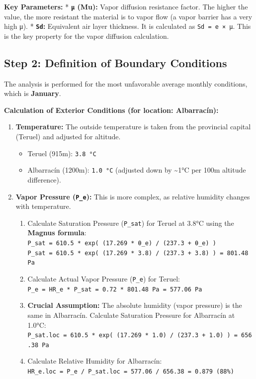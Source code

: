 \documentclass[
  10pt,
  letterpaper,
]{scrbook}
\providecommand{\tightlist}{%
  \setlength{\itemsep}{0pt}\setlength{\parskip}{0pt}}
\begin{document}
\textbf{Key Parameters:} * \textbf{\texttt{μ} (Mu):} Vapor diffusion
resistance factor. The higher the value, the more resistant the material
is to vapor flow (a vapor barrier has a very high μ). *
\textbf{\texttt{Sd}:} Equivalent air layer thickness. It is calculated
as \texttt{Sd\ =\ e\ ×\ μ}. This is the key property for the vapor
diffusion calculation.

\subsection{Step 2: Definition of Boundary
Conditions}\label{step-2-definition-of-boundary-conditions}

The analysis is performed for the most unfavorable average monthly
conditions, which is \textbf{January}.

\textbf{Calculation of Exterior Conditions (for location: Albarracín):}

\begin{enumerate}
\def\labelenumi{\arabic{enumi}.}
\tightlist
\item
  \textbf{Temperature:} The outside temperature is taken from the
  provincial capital (Teruel) and adjusted for altitude.

  \begin{itemize}
  \tightlist
  \item
    Teruel (915m): \texttt{3.8\ °C}
  \item
    Albarracín (1200m): \texttt{1.0\ °C} (adjusted down by
    \textasciitilde1°C per 100m altitude difference).
  \end{itemize}
\item
  \textbf{Vapor Pressure (\texttt{P\_e}):} This is more complex, as
  relative humidity changes with temperature.

  \begin{enumerate}
  \def\labelenumii{\alph{enumii}.}
  \tightlist
  \item
    Calculate Saturation Pressure (\texttt{P\_sat}) for Teruel at 3.8°C
    using the \textbf{Magnus formula}:
    \texttt{P\_sat\ =\ 610.5\ *\ exp(\ (17.269\ *\ θ\_e)\ /\ (237.3\ +\ θ\_e)\ )}
    \texttt{P\_sat\ =\ 610.5\ *\ exp(\ (17.269\ *\ 3.8)\ /\ (237.3\ +\ 3.8)\ )\ =\ 801.48\ Pa}
  \item
    Calculate Actual Vapor Pressure (\texttt{P\_e}) for Teruel:
    \texttt{P\_e\ =\ HR\_e\ *\ P\_sat\ =\ 0.72\ *\ 801.48\ Pa\ =\ 577.06\ Pa}
  \item
    \textbf{Crucial Assumption:} The absolute humidity (vapor pressure)
    is the same in Albarracín. Calculate Saturation Pressure for
    Albarracín at 1.0°C:
    \texttt{P\_sat.loc\ =\ 610.5\ *\ exp(\ (17.269\ *\ 1.0)\ /\ (237.3\ +\ 1.0)\ )\ =\ 656.38\ Pa}
  \item
    Calculate Relative Humidity for Albarracín:
    \texttt{HR\_e.loc\ =\ P\_e\ /\ P\_sat.loc\ =\ 577.06\ /\ 656.38\ =\ 0.879\ (88\%)}
  \end{enumerate}
\end{enumerate}
\end{document}

